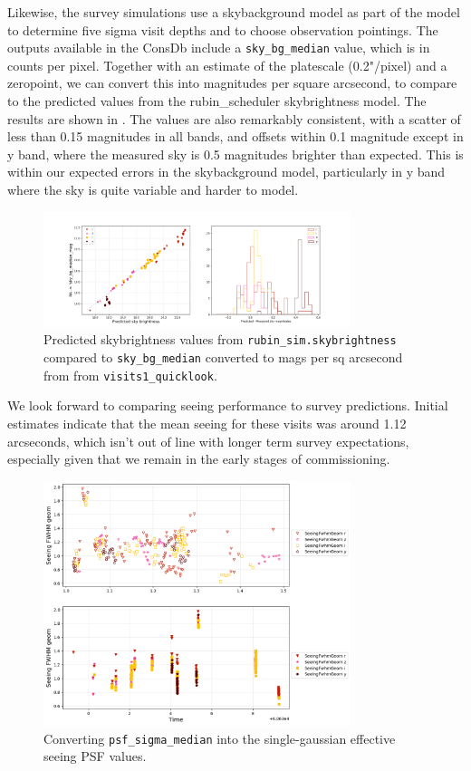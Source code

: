 Likewise, the survey simulations use a skybackground model as part of the model to determine five sigma visit depths and to choose observation pointings. The outputs available in the ConsDb include a \texttt{sky\_bg\_median} value, which is in counts per pixel. Together with an estimate of the platescale (0.2"/pixel) and a zeropoint, we can convert this into magnitudes per square arcsecond, to compare to the predicted values from the rubin\_scheduler skybrightness model. The results are shown in .  The values are also remarkably consistent, with a scatter of less than 0.15 magnitudes in all bands, and offsets within 0.1 magnitude except in y band, where the measured sky is 0.5 magnitudes brighter than expected. This is  within our expected errors in the skybackground model, particularly in y band where the sky is quite variable and harder to model.

\begin{figure}
    \centering
    \includegraphics[width=0.8\textwidth]{sp/sky.png}
    \caption{Predicted skybrightness values from \texttt{rubin\_sim.skybrightness} compared to
      \texttt{sky\_bg\_median} converted to mags per sq arcsecond  from  from \texttt{visits1\_quicklook}.}
    \label{fig:sky}
    \end{figure}


We look forward to comparing seeing performance to survey predictions. Initial estimates indicate that the mean seeing for these visits was around 1.12 arcseconds, which isn't out of line with longer term survey expectations, especially given that we remain in the early stages of commissioning.

\begin{figure}
    \centering
    \includegraphics[width=0.8\textwidth]{sp/seeing.png}
    \caption{Converting \texttt{psf\_sigma\_median} into the single-gaussian effective seeing PSF values.}
    \label{fig:seeing}
    \end{figure}


